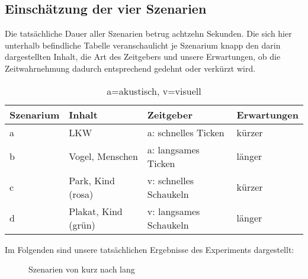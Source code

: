 \documentclass{Paper}
\begin{document}
\subsection{Einschätzung der vier Szenarien}
\newpage
Die tatsächliche Dauer aller Szenarien betrug achtzehn Sekunden. Die sich hier unterhalb befindliche Tabelle veranschaulicht je Szenarium knapp den darin dargestellten Inhalt, die Art des Zeitgebers und unsere Erwartungen, ob die Zeitwahrnehmung dadurch entsprechend gedehnt oder verkürzt wird.
\begin{table}[H]
\centering
\begin{tabular}{llll}
	\hline
	\textbf{Szenarium} & \textbf{Inhalt} & \textbf{Zeitgeber}& \textbf{Erwartungen} \\
	\hline
	a & LKW & a: schnelles Ticken & kürzer \\
	b & Vogel, Menschen & a: langsames Ticken & länger\\
	c & Park, Kind (rosa) & v: schnelles Schaukeln & kürzer\\
	d & Plakat, Kind (grün) & v: langsames Schaukeln & länger \\
	\hline
\end{tabular}
\caption{a=akustisch, v=visuell}
\label{AkVis}
\end{table}

Im Folgenden sind unsere tatsächlichen Ergebnisse des Experiments dargestellt: 

\begin{figure}[H]
  \caption{Szenarien von kurz nach lang}
  \label{SzenarienKurzLang}
  \end{figure}
\end{document}
